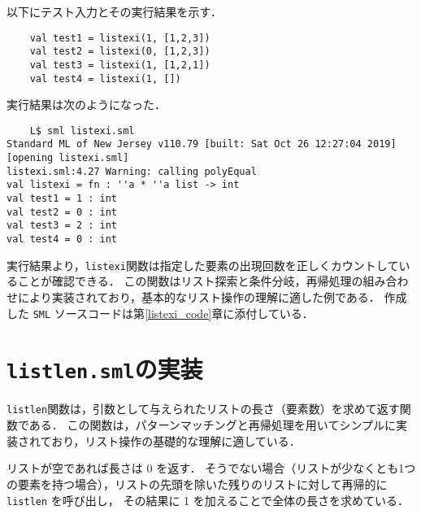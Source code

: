 \documentclass[autodetect-engine,dvi=dvipdfmx,ja=standard,
               a4j,11pt]{bxjsarticle}
\begin{document}
以下にテスト入力とその実行結果を示す．
\begin{Verbatim}
    val test1 = listexi(1, [1,2,3])
    val test2 = listexi(0, [1,2,3])
    val test3 = listexi(1, [1,2,1])
    val test4 = listexi(1, [])    
\end{Verbatim}
実行結果は次のようになった．
\begin{Verbatim}
    L$ sml listexi.sml 
Standard ML of New Jersey v110.79 [built: Sat Oct 26 12:27:04 2019]
[opening listexi.sml]
listexi.sml:4.27 Warning: calling polyEqual
val listexi = fn : ''a * ''a list -> int
val test1 = 1 : int
val test2 = 0 : int
val test3 = 2 : int
val test4 = 0 : int
\end{Verbatim}
実行結果より，\texttt{listexi}関数は指定した要素の出現回数を正しくカウントしていることが確認できる．
この関数はリスト探索と条件分岐，再帰処理の組み合わせにより実装されており，基本的なリスト操作の理解に適した例である．
作成した \texttt{SML} ソースコードは第\ref{listexi_code}章に添付している．
\section{\texttt{listlen.sml}の実装}
\texttt{listlen}関数は，引数として与えられたリストの長さ（要素数）を求めて返す関数である．
この関数は，パターンマッチングと再帰処理を用いてシンプルに実装されており，リスト操作の基礎的な理解に適している．

リストが空であれば長さは 0 を返す．
そうでない場合（リストが少なくとも1つの要素を持つ場合），リストの先頭を除いた残りのリストに対して再帰的に \texttt{listlen} を呼び出し，
その結果に 1 を加えることで全体の長さを求めている．
\end{document}
